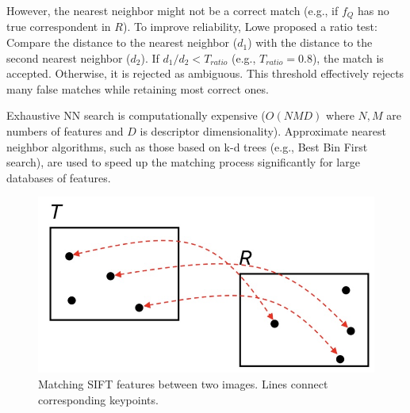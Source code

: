 However, the nearest neighbor might not be a correct match (e.g., if $f_Q$ has no true correspondent in $R$). To improve reliability, Lowe proposed a ratio test:
Compare the distance to the nearest neighbor ($d_1$) with the distance to the second nearest neighbor ($d_2$). If $d_1 / d_2 < T_{ratio}$ (e.g., $T_{ratio} = 0.8$), the match is accepted. Otherwise, it is rejected as ambiguous. This threshold effectively rejects many false matches while retaining most correct ones.

Exhaustive NN search is computationally expensive ($O(N M D)$ where $N, M$ are numbers of features and $D$ is descriptor dimensionality). Approximate nearest neighbor algorithms, such as those based on k-d trees (e.g., Best Bin First search), are used to speed up the matching process significantly for large databases of features.

\begin{figure}[htbp]
  \centering
  \includegraphics[width=0.5\linewidth]{./img/matching_sift.jpg}
  \caption{Matching SIFT features between two images. Lines connect corresponding keypoints.}
  \label{fig:matching_sift}
\end{figure}





